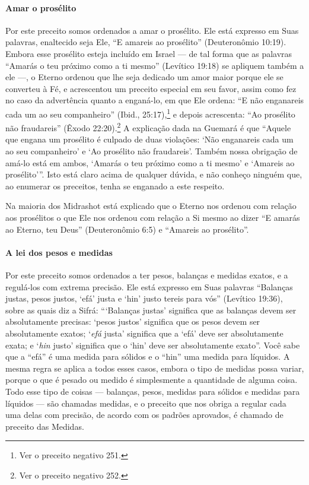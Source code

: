\paragraph{Amar o prosélito}

Por este preceito somos ordenados a amar o prosélito. Ele está expresso
em Suas palavras, enaltecido seja Ele, ``E amareis ao prosélito''
(Deuteronômio 10:19). Embora esse prosélito esteja incluído em Israel
--- de tal forma que as palavras ``Amarás o teu próximo como a ti mesmo'' (Levítico
19:18) se apliquem também a ele ---, o Eterno ordenou que lhe seja
dedicado um amor maior porque ele se converteu à Fé, e acrescentou um
preceito especial em seu favor, assim como fez no caso da advertência
quanto a enganá-lo, em que Ele ordena: ``E não enganareis cada um ao seu
companheiro'' (Ibid., 25:17),\footnote{Ver o preceito negativo 251.} e depois acrescenta: ``Ao prosélito não fraudareis'' (Êxodo 22:20).\footnote{Ver o preceito negativo 252.} A explicação
dada na Guemará é que ``Aquele que engana um prosélito é culpado de duas
violações: `Não enganareis cada um ao seu companheiro' e `Ao prosélito
não fraudareis'. Também nossa obrigação de amá-lo está em ambos, `Amarás
o teu próximo como a ti mesmo' e `Amareis ao prosélito'''. Isto está
claro acima de qualquer dúvida, e não conheço ninguém que, ao enumerar
os preceitos, tenha se enganado a este respeito.

Na maioria dos Midrashot está explicado que o Eterno nos ordenou com
relação aos prosélitos o que Ele nos ordenou com relação a Si mesmo ao
dizer ``E amarás ao Eterno, teu Deus'' (Deuteronômio 6:5) e ``Amareis ao
prosélito''.

\paragraph{A lei dos pesos e medidas}

Por este preceito somos ordenados a ter pesos, balanças e medidas
exatos, e a regulá-los com extrema precisão. Ele está expresso em Suas
palavras ``Balanças justas, pesos justos, `efá' justa e `hin' justo
tereis para vós'' (Levítico 19:36), sobre as quais diz a Sifrá:
```Balanças justas' significa que as balanças devem ser absolutamente
precisas: `pesos justos' significa que os pesos devem ser absolutamente
exatos; `\emph{efá} justa' significa que a `efá' deve ser absolutamente
exata; e `\emph{hin} justo' significa que o `hin' deve ser absolutamente
exato''. Você sabe que a ``efá'' é uma medida para sólidos e o ``hin''
uma medida para líquidos. A mesma regra se aplica a todos esses casos,
embora o tipo de medidas possa variar, porque o que é pesado ou medido é
simplesmente a quantidade de alguma coisa. Todo esse tipo de coisas ---
balanças, pesos, medidas para sólidos e medidas para líquidos --- são
chamadas medidas, e o preceito que nos obriga a regular cada uma delas
com precisão, de acordo com os padrões aprovados, é chamado de preceito
das Medidas.

